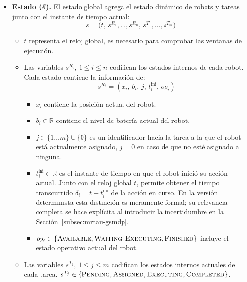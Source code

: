 \begin{itemize}   
    \item \textbf{Estado ($\mathcal{S}$).} El estado global agrega el estado dinámico de robots y tareas junto con el instante de tiempo actual:
    \begin{equation} 
    s=\big(t,\,s^{R_1},\dots,s^{R_n},\,s^{T_1},\dots,s^{T_m}\big) 
    \end{equation} 

    \begin{itemize}
        \item $t$ representa el reloj global, es necesario para comprobar las ventanas de ejecución.
        \item Las variables $s^{R_i},\ 1 \le i \le n$ codifican los estados internos de cada robot. Cada estado contiene la información de:
        \begin{equation}
           s^{R_i}=(x_i,\,b_i,\,j,\,t^{\mathrm{ini}}_i,\,\mathit{op}_i) 
        \end{equation}
        \begin{itemize}
            \item $x_i$ contiene la posición actual del robot.
            \item $b_i \in \mathbb{R}$ contiene el nivel de batería actual del robot.
            \item $j \in \{1 \dots m\} \cup \{0\} $ es un identificador hacia la tarea a la que el robot está actualmente asignado, $j = 0$ en caso de que no esté asignado a ninguna.
            \item $t^{\mathrm{ini}}_i \in \mathbb{R}$ es el instante de tiempo en que el robot inició su acción actual. Junto con el reloj global $t$, permite obtener el tiempo transcurrido $\delta_i = t - t^{\mathrm{ini}}_i$ de la acción en curso. En la versión determinista esta distinción es meramente formal; su relevancia completa se hace explícita al introducir la incertidumbre en la Sección~\ref{subsec:mrtau-gsmdp}.
            \item $\textit{op}_i \in  \{\textsc{Available}, \textsc{Waiting}, \textsc{Executing}, \textsc{Finished} \}$ incluye el estado operativo actual del robot. 
        \end{itemize}
        \item Las variables $s^{T_j},\ 1 \le j \le m$ codifican los estados internos actuales de cada tarea. $s^{T_j} \in  \{\textsc{Pending}, \textsc{Assigned}, \textsc{Executing}, \textsc{Completed} \}$.
        

\end{itemize}
\end{itemize}
